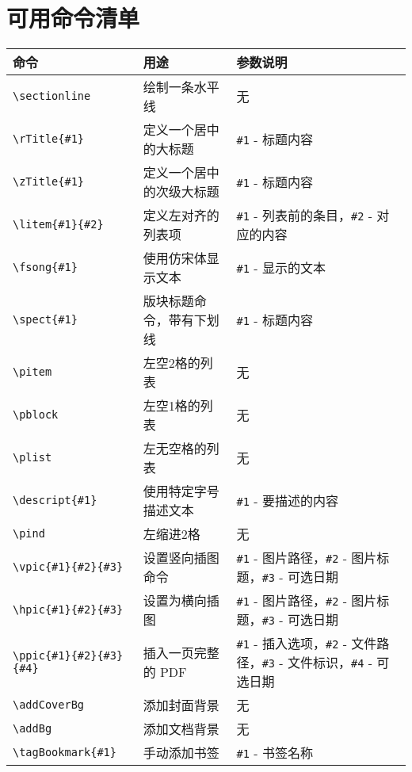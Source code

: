 \documentclass[a4paper,12pt]{ctexart}
\begin{document}
	\section{可用命令清单}
	\begin{table}[ht]
		\centering
		\renewcommand{\arraystretch}{1.2}
		\begin{tabularx}{\textwidth}{|l|>{\raggedright\arraybackslash}X|>{\raggedright\arraybackslash}X|}
			\hline
			\textbf{命令} & \textbf{用途} & \textbf{参数说明} \\
			\hline
			\texttt{\textbackslash sectionline} & 绘制一条水平线 & 无 \\
			\hline
			\texttt{\textbackslash rTitle\{\#1\}} & 定义一个居中的大标题 & \texttt{\#1} - 标题内容 \\
			\hline
			\texttt{\textbackslash zTitle\{\#1\}} & 定义一个居中的次级大标题 & \texttt{\#1} - 标题内容 \\
			\hline
			\texttt{\textbackslash litem\{\#1\}\{\#2\}} & 定义左对齐的列表项 & \texttt{\#1} - 列表前的条目，\texttt{\#2} - 对应的内容 \\
			\hline
			\texttt{\textbackslash fsong\{\#1\}} & 使用仿宋体显示文本 & \texttt{\#1} - 显示的文本 \\
			\hline
			\texttt{\textbackslash spect\{\#1\}} & 版块标题命令，带有下划线 & \texttt{\#1} - 标题内容 \\
			\hline
			\texttt{\textbackslash pitem} & 左空2格的列表 & 无 \\
			\hline
			\texttt{\textbackslash pblock} & 左空1格的列表 & 无 \\
			\hline
			\texttt{\textbackslash plist} & 左无空格的列表 & 无 \\
			\hline
			\texttt{\textbackslash descript\{\#1\}} & 使用特定字号描述文本 & \texttt{\#1} - 要描述的内容 \\
			\hline
			\texttt{\textbackslash pind} & 左缩进2格 & 无 \\
			\hline
			\texttt{\textbackslash vpic\{\#1\}\{\#2\}\{\#3\}} & 设置竖向插图命令 & \texttt{\#1} - 图片路径，\texttt{\#2} - 图片标题，\texttt{\#3} - 可选日期 \\
			\hline
			\texttt{\textbackslash hpic\{\#1\}\{\#2\}\{\#3\}} & 设置为横向插图 & \texttt{\#1} - 图片路径，\texttt{\#2} - 图片标题，\texttt{\#3} - 可选日期 \\
			\hline
			\texttt{\textbackslash ppic\{\#1\}\{\#2\}\{\#3\}\{\#4\}} & 插入一页完整的 PDF & \texttt{\#1} - 插入选项，\texttt{\#2} - 文件路径，\texttt{\#3} - 文件标识，\texttt{\#4} - 可选日期 \\
			\hline
			\texttt{\textbackslash addCoverBg} & 添加封面背景 & 无 \\
			\hline
			\texttt{\textbackslash addBg} & 添加文档背景 & 无 \\
			\hline
			\texttt{\textbackslash tagBookmark\{\#1\}} & 手动添加书签 & \texttt{\#1} - 书签名称 \\
			\hline
		\end{tabularx}
	\end{table}
\end{document}

